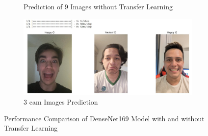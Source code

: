 \documentclass[conference]{IEEEtran}
\begin{document}
\begin{figure}[htbp]
\begin{subfigure}{0.22\textwidth}
        \caption{Prediction of 9 Images without Transfer Learning}
        \label{fig:9imageprediction_NOTLmode}
    \end{subfigure}
    \begin{subfigure}{0.22\textwidth}
        \includegraphics[width=\textwidth]{Figures/3camimageprediction.png}
        \caption{3 cam Images Prediction}
        \label{fig:3camimageprediction}
    \end{subfigure}
    \caption{Performance Comparison of DenseNet169 Model with and without Transfer Learning}
    \label{fig:results_summary}
\end{figure}
\end{document}

